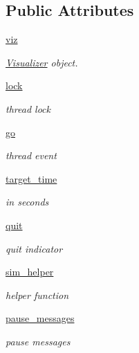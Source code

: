 \subsection*{Public Attributes}
\begin{DoxyCompactItemize}
\item 
\hyperlink{classvisualizer_1_1core_1_1SimulationThread_ab3615e7268de3c70ec0d11c6b595d7ec}{viz}
\begin{DoxyCompactList}\small\item\em \hyperlink{classvisualizer_1_1core_1_1Visualizer}{Visualizer} object. \end{DoxyCompactList}\item 
\hyperlink{classvisualizer_1_1core_1_1SimulationThread_a3262a20d074f55cd3ae531e6bb690fdb}{lock}
\begin{DoxyCompactList}\small\item\em thread lock \end{DoxyCompactList}\item 
\hyperlink{classvisualizer_1_1core_1_1SimulationThread_a7e64c094f90302c5d7a42da3b5da6e88}{go}
\begin{DoxyCompactList}\small\item\em thread event \end{DoxyCompactList}\item 
\hyperlink{classvisualizer_1_1core_1_1SimulationThread_a3625a411f9d892def63777fc1114967c}{target\+\_\+time}
\begin{DoxyCompactList}\small\item\em in seconds \end{DoxyCompactList}\item 
\hyperlink{classvisualizer_1_1core_1_1SimulationThread_a3d106bf935d132098c9fe3f909020819}{quit}
\begin{DoxyCompactList}\small\item\em quit indicator \end{DoxyCompactList}\item 
\hyperlink{classvisualizer_1_1core_1_1SimulationThread_a6ea7aba83128cc66d26972b469ad9339}{sim\+\_\+helper}
\begin{DoxyCompactList}\small\item\em helper function \end{DoxyCompactList}\item 
\hyperlink{classvisualizer_1_1core_1_1SimulationThread_a0645b6d9f8cadce5ab77e3cd4bc5d99b}{pause\+\_\+messages}
\begin{DoxyCompactList}\small\item\em pause messages \end{DoxyCompactList}\end{DoxyCompactItemize}


